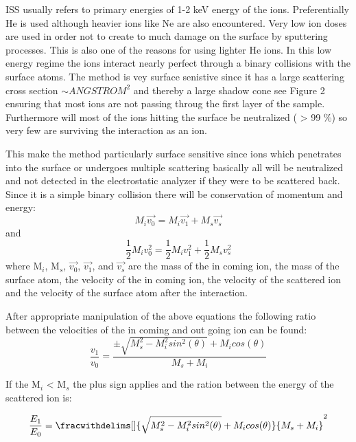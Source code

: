 \vspace{1cm}



ISS usually refers to primary energies of 1-2 keV energy of the ions. Preferentially He is used although heavier ions like Ne are also encountered. Very low ion doses are used in order not to create to much damage on the surface by sputtering processes. This is also one of the reasons for using lighter He ions. In this low  energy regime the ions interact nearly perfect through a binary collisions with the surface atoms. The method is vey surface senistive since it has a large scattering cross section $\sim ANGSTROM^{2}$ and thereby a large shadow cone see Figure 2 ensuring that most ions are not passing throug the first layer of the sample. Furthermore will most of the ions hitting the surface be neutralized ( > 99 \%) so very few are surviving the interaction as an ion.



 This make the method particularly surface sensitive since ions which penetrates into the surface or undergoes multiple scattering basically all will be neutralized and not detected in the electrostatic analyzer if they were to be scattered back. Since it is a simple binary collision there will be conservation of momentum and energy:
\begin{equation}
M_{i} \vec{v_{0}} = M_{i} \vec{v_{1}} + M_{s} \vec{v_{s}}
\end{equation}
and 
\begin{equation}
\frac{1}{2} M_{i} v_{0}^2 = \frac{1}{2}M_{i} v_{1}^{2}  + \frac{1}{2} M_{s} v_{s}^{2}
\end{equation}
where M$_i$, M$_s$, $\vec{v_0}$, $\vec{v_1}$, and $\vec{v_s}$ are the mass of the in coming ion, the mass of the surface atom, the velocity of the in coming ion, the velocity of the scattered ion and the velocity of the surface atom after the interaction.

After appropriate manipulation of the above equations the following ratio between the velocities of the in coming and out going ion can be found:
\begin{equation}
\frac{v_{1}}{v_{0}} = \frac{\pm \sqrt{M_{s}^{2}-M_{i}^2 sin^{2}(\theta)} + M_{i} cos(\theta)}{M_s+M_i}
\end{equation}

If the M$_{i}$ < M$_{s}$ the plus sign applies and the ration between the energy of the scattered ion is:

\begin{equation}
\frac{E_{1}}{E_{0}} =  \fracwithdelims[]{\sqrt{M_{s}^{2}-M_{i}^2 sin^{2}(\theta)} + M_{i} cos(\theta)}{M_s+M_i} ^{2}
\end{equation}

